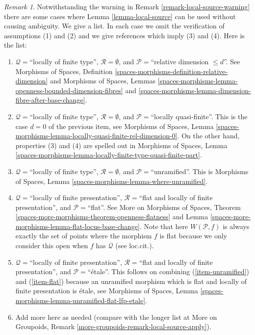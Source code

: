 \documentclass{stacks-project}
\theoremstyle{plain}
\theoremstyle{definition}
\theoremstyle{remark}
\newtheorem{remark}[subsection]{Remark}
\numberwithin{equation}{subsection}
\begin{document}
\begin{remark}
\label{remark-local-source-apply}
Notwithstanding the warning in
Remark \ref{remark-local-source-warning}
there are some cases where
Lemma \ref{lemma-local-source}
can be used without causing ambiguity.
We give a list. In each case we omit the verification of
assumptions (1) and (2) and we give references which imply
(3) and (4). Here is the list:
\begin{enumerate}
\item
\label{item-rel-dim-leq-d}
$\mathcal{Q} = $``locally of finite type'', $\mathcal{R} = \emptyset$,
and $\mathcal{P} =$``relative dimension $\leq d$''.
See
Morphisms of Spaces,
Definition \ref{spaces-morphisms-definition-relative-dimension}
and
Morphisms of Spaces, Lemmas
\ref{spaces-morphisms-lemma-openness-bounded-dimension-fibres} and
\ref{spaces-morphisms-lemma-dimension-fibre-after-base-change}.
\item
\label{item-loc-quasi-finite}
$\mathcal{Q} =$``locally of finite type'', $\mathcal{R} = \emptyset$,
and $\mathcal{P} =$``locally quasi-finite''.
This is the case $d = 0$ of the previous item, see
Morphisms of Spaces, Lemma
\ref{spaces-morphisms-lemma-locally-quasi-finite-rel-dimension-0}.
On the other hand, properties (3) and (4) are spelled out in
Morphisms of Spaces, Lemma
\ref{spaces-morphisms-lemma-locally-finite-type-quasi-finite-part}.
\item
\label{item-unramified}
$\mathcal{Q} = $``locally of finite type'', $\mathcal{R} = \emptyset$,
and $\mathcal{P} =$``unramified''. This is
Morphisms of Spaces, Lemma \ref{spaces-morphisms-lemma-where-unramified}.
\item
\label{item-flat}
$\mathcal{Q} =$``locally of finite presentation'',
$\mathcal{R} =$``flat and locally of finite presentation'', and
$\mathcal{P} =$``flat''. See
More on Morphisms of Spaces, Theorem
\ref{spaces-more-morphisms-theorem-openness-flatness} and
Lemma \ref{spaces-more-morphisms-lemma-flat-locus-base-change}.
Note that here $W(\mathcal{P}, f)$ is always exactly the set of points
where the morphism $f$ is flat because we only consider this open
when $f$ has $\mathcal{Q}$ (see loc.cit.).
\item
\label{item-etale}
$\mathcal{Q} =$``locally of finite presentation'',
$\mathcal{R} =$``flat and locally of finite presentation'', and
$\mathcal{P}=$``\'etale''. This follows on combining
(\ref{item-unramified}) and (\ref{item-flat}) because an unramified
morphism which is flat and locally of finite presentation is \'etale, see
Morphisms of Spaces,
Lemma \ref{spaces-morphisms-lemma-unramified-flat-lfp-etale}.
\item Add more here as needed (compare with the longer list at
More on Groupoids, Remark \ref{more-groupoids-remark-local-source-apply}).
\end{enumerate}
\end{remark}
\end{document}
